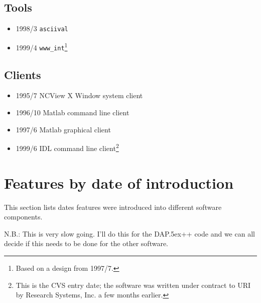 \documentclass{article}
\newcommand{\dap}{\rm {\small DAP}\raise.5ex\hbox{\footnotesize ++}\xspace}
\begin{document}
\subsection{Tools}

\begin{itemize}
\item 1998/3 \texttt{asciival}
\item 1999/4 \texttt{www\_int}\footnote{Based on a design from 1997/7.}
\end{itemize}

\subsection{Clients}

\begin{itemize}
\item 1995/7 NCView X Window system client
\item 1996/10 Matlab command line client
\item 1997/6 Matlab graphical client
\item 1999/6 IDL command line client\footnote{This is the CVS entry date; the
    software was written under contract to URI by Research Systems, Inc.
    a few months earlier.}
\end{itemize}

\section{Features by date of introduction}

This section lists dates features were introduced into different software
components. 

N.B.: This is very slow going. I'll do this for the \dap code and we can all
decide if this needs to be done for the other software. 
\end{document}
